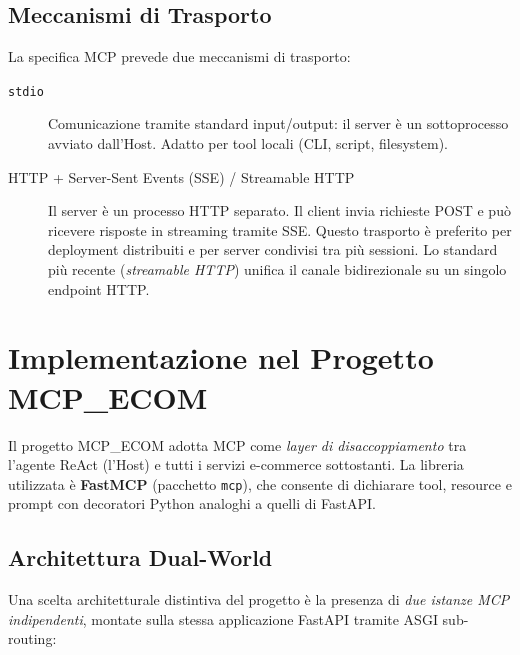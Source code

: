 \subsection{Meccanismi di Trasporto}
\label{subsec:mcp-transport}

La specifica MCP prevede due meccanismi di trasporto:

\begin{description}
    \item[\texttt{stdio}] Comunicazione tramite standard input/output:
        il server è un sottoprocesso avviato dall'Host. Adatto per
        tool locali (CLI, script, filesystem).

    \item[HTTP + Server-Sent Events (SSE) / Streamable HTTP]
        Il server è un processo HTTP separato. Il client invia richieste
        POST e può ricevere risposte in streaming tramite SSE. Questo
        trasporto è preferito per deployment distribuiti e per server
        condivisi tra più sessioni. Lo standard più recente
        (\emph{streamable HTTP}) unifica il canale bidirezionale su
        un singolo endpoint HTTP.
\end{description}


\section{Implementazione nel Progetto MCP\_ECOM}
\label{sec:mcp-impl}

Il progetto MCP\_ECOM adotta MCP come \emph{layer di disaccoppiamento}
tra l'agente ReAct (l'Host) e tutti i servizi e-commerce sottostanti.
La libreria utilizzata è \textbf{FastMCP} (pacchetto \texttt{mcp}),
che consente di dichiarare tool, resource e prompt con decoratori Python
analoghi a quelli di FastAPI.

\subsection{Architettura Dual-World}
\label{subsec:mcp-dual-world}

Una scelta architetturale distintiva del progetto è la presenza di
\emph{due istanze MCP indipendenti}, montate sulla stessa applicazione
FastAPI tramite ASGI sub-routing:

